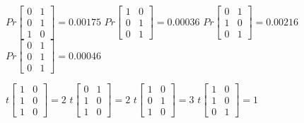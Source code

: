 \documentclass{article}
\begin{document}
\begin{itemize}
\begin{itemize}
$Pr \left[ \begin{smallmatrix} 0&1 \\ 0&1 \\   1&0  \end{smallmatrix}\right] = 0.00175 $ \hspace{2em}
$Pr \left[ \begin{smallmatrix} 1&0 \\ 0&1 \\   0&1  \end{smallmatrix}\right] = 0.00036 $ \hspace{2em}
$Pr \left[ \begin{smallmatrix} 0&1 \\ 1&0 \\   0&1  \end{smallmatrix}\right] = 0.00216 $ \hspace{2em}
$Pr \left[ \begin{smallmatrix} 0&1 \\ 0&1 \\   0&1  \end{smallmatrix}\right] = 0.00046 $ \hspace{2em}
\vspace{2em}

$t \left[ \begin{smallmatrix} 1&0 \\ 1&0 \\   1&0  \end{smallmatrix}\right] = 2 $ \hspace{2em}
$t \left[ \begin{smallmatrix} 0&1 \\ 1&0 \\   1&0  \end{smallmatrix}\right] = 2 $ \hspace{2em}
$t \left[ \begin{smallmatrix} 1&0 \\ 0&1 \\   1&0  \end{smallmatrix}\right] = 3 $ \hspace{2em}
$t \left[ \begin{smallmatrix} 1&0 \\ 1&0 \\   0&1  \end{smallmatrix}\right] = 1 $ \hspace{2em}\vspace{1em}


\end{itemize}
\end{itemize}
\end{document}
